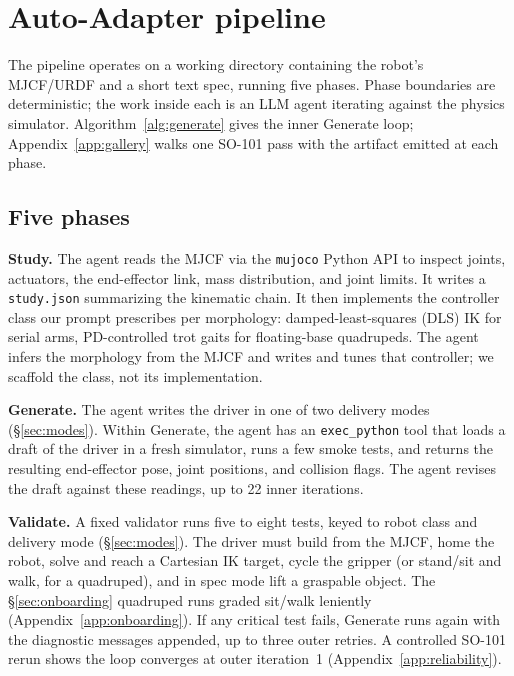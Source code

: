 \section{Auto-Adapter pipeline}
\label{sec:pipeline}



The pipeline operates on a working directory containing the
robot's MJCF/URDF and a short text spec, running five phases.
Phase boundaries are deterministic;
the work inside each is an LLM agent iterating against the physics
simulator. Algorithm~\ref{alg:generate} gives the inner Generate
loop; Appendix~\ref{app:gallery} walks one SO-101 pass with the
artifact emitted at each phase.

\subsection{Five phases}

\textbf{Study.} The agent reads the MJCF via the \texttt{mujoco}
Python API to inspect joints, actuators, the end-effector link, mass
distribution, and joint limits. It writes a \texttt{study.json}
summarizing the kinematic chain. It then implements the controller
class our prompt prescribes per morphology: damped-least-squares
(DLS) IK for serial arms, PD-controlled trot gaits for floating-base
quadrupeds. The agent infers the morphology from the MJCF and writes
and tunes that controller; we scaffold the class, not its
implementation.

\textbf{Generate.} The agent writes the driver in one of two
delivery modes (\S\ref{sec:modes}). Within Generate, the agent
has an \texttt{exec\_python} tool that loads a draft of the
driver in a fresh simulator, runs a few smoke tests, and returns
the resulting end-effector pose, joint positions, and collision
flags. The agent revises the draft against these readings, up to
22 inner iterations.

\textbf{Validate.} A fixed validator runs five to eight tests,
keyed to robot class and delivery mode (\S\ref{sec:modes}). The
driver must build from the MJCF, home the robot, solve and reach a
Cartesian IK target, cycle the gripper (or stand/sit and walk, for
a quadruped), and in spec mode lift a graspable object. The
\S\ref{sec:onboarding} quadruped runs graded sit/walk leniently
(Appendix~\ref{app:onboarding}). If any critical test fails, Generate
runs again with the diagnostic messages appended, up to three outer
retries. A controlled SO-101 rerun shows the loop converges at outer
iteration~1 (Appendix~\ref{app:reliability}).

